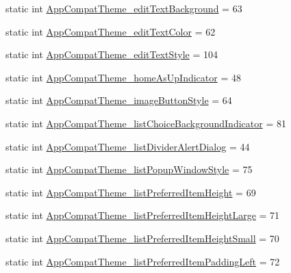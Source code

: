 \begin{DoxyCompactItemize}
\item 
static int \hyperlink{classandroid_1_1support_1_1design_1_1R_1_1styleable_a1ee151d494fb454277ff281e425c5556}{App\+Compat\+Theme\+\_\+edit\+Text\+Background} = 63
\item 
static int \hyperlink{classandroid_1_1support_1_1design_1_1R_1_1styleable_af735eb4a960975c07d0f92771af6d22c}{App\+Compat\+Theme\+\_\+edit\+Text\+Color} = 62
\item 
static int \hyperlink{classandroid_1_1support_1_1design_1_1R_1_1styleable_acc9842f5a15682537a17a07297b3d1fa}{App\+Compat\+Theme\+\_\+edit\+Text\+Style} = 104
\item 
static int \hyperlink{classandroid_1_1support_1_1design_1_1R_1_1styleable_a1b9f70963e0781f0c4c4e47161f8cb0f}{App\+Compat\+Theme\+\_\+home\+As\+Up\+Indicator} = 48
\item 
static int \hyperlink{classandroid_1_1support_1_1design_1_1R_1_1styleable_ac6d297b6830e11aed44a3f4f6ae32e54}{App\+Compat\+Theme\+\_\+image\+Button\+Style} = 64
\item 
static int \hyperlink{classandroid_1_1support_1_1design_1_1R_1_1styleable_a1818805fc2d169ac39a9c5c20b3cec4f}{App\+Compat\+Theme\+\_\+list\+Choice\+Background\+Indicator} = 81
\item 
static int \hyperlink{classandroid_1_1support_1_1design_1_1R_1_1styleable_a05b88d6115e3a28d5aa99a5d7c9aaace}{App\+Compat\+Theme\+\_\+list\+Divider\+Alert\+Dialog} = 44
\item 
static int \hyperlink{classandroid_1_1support_1_1design_1_1R_1_1styleable_ab38358b7c84d4dbc393c9808d07c0427}{App\+Compat\+Theme\+\_\+list\+Popup\+Window\+Style} = 75
\item 
static int \hyperlink{classandroid_1_1support_1_1design_1_1R_1_1styleable_a8cff2e543a4edae5b403be6bb3c47eec}{App\+Compat\+Theme\+\_\+list\+Preferred\+Item\+Height} = 69
\item 
static int \hyperlink{classandroid_1_1support_1_1design_1_1R_1_1styleable_a183ea7959584cc75c934bead3330b82a}{App\+Compat\+Theme\+\_\+list\+Preferred\+Item\+Height\+Large} = 71
\item 
static int \hyperlink{classandroid_1_1support_1_1design_1_1R_1_1styleable_a3fb383aca061541233e8348ffa9b12fc}{App\+Compat\+Theme\+\_\+list\+Preferred\+Item\+Height\+Small} = 70
\item 
static int \hyperlink{classandroid_1_1support_1_1design_1_1R_1_1styleable_abd5288e1dbcfcf3972724d7aded718da}{App\+Compat\+Theme\+\_\+list\+Preferred\+Item\+Padding\+Left} = 72
\item 

\end{DoxyCompactItemize}
